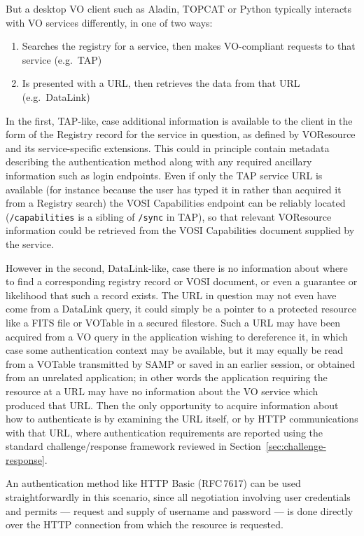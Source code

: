 \documentclass[11pt,a4paper]{ivoa}
\newcommand{\rfc}[1]{RFC\,#1}
\begin{document}
But a desktop VO client such as Aladin, TOPCAT or Python
typically interacts with VO services differently, in one of two
ways:
\begin{enumerate}
\item Searches the registry for a service, then makes VO-compliant
      requests to that service (e.g.\ TAP)
\item Is presented with a URL, then retrieves the data from that URL
      (e.g.\ DataLink)
\end{enumerate}
In the first, TAP-like, case additional information is available to the
client in the form of the Registry record for the service in question,
as defined by VOResource \citep{2008ivoa.spec.0222P}
and its service-specific extensions.
This could in principle contain metadata describing the authentication
method along with any required ancillary information such as
login endpoints.
Even if only the TAP service URL is available
(for instance because the user has typed it in rather than acquired it
from a Registry search) the VOSI Capabilities endpoint can be reliably
located ({\tt /capabilities} is a sibling of {\tt /sync} in TAP),
so that relevant VOResource information could be retrieved from the VOSI
Capabilities document supplied by the service.

However in the second, DataLink-like, case
there is no information about where to find a corresponding
registry record or VOSI document,
or even a guarantee or likelihood that such a record exists.
The URL in question may not even have come from a DataLink query,
it could simply be a pointer to a protected resource like a
FITS file or VOTable in a secured filestore.
Such a URL may have been acquired from a VO query in the application
wishing to dereference it, in which case some authentication context
may be available,
but it may equally be read from a VOTable transmitted by SAMP
or saved in an earlier session, or obtained from an unrelated application;
in other words the application requiring the resource at a URL may
have no information about the VO service which produced that URL.
Then the only opportunity to acquire information about how to authenticate
is by examining the URL itself, or by HTTP communications with that URL,
where authentication requirements are reported using the standard
challenge/response framework reviewed in Section~\ref{sec:challenge-response}.

An authentication method like HTTP Basic (\rfc{7617})
can be used straightforwardly in this scenario,
since all negotiation involving user credentials and permits ---
request and supply of username and password ---
is done directly
over the HTTP connection from which the resource is requested.
\end{document}
